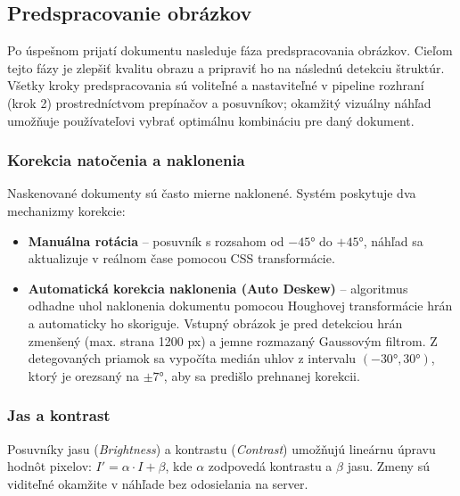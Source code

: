 

\subsection{Predspracovanie obrázkov}

Po úspešnom prijatí dokumentu nasleduje fáza predspracovania obrázkov. Cieľom tejto fázy je zlepšiť kvalitu obrazu a pripraviť ho na následnú detekciu štruktúr. Všetky kroky predspracovania sú voliteľné a nastaviteľné v pipeline rozhraní (krok 2) prostredníctvom prepínačov a posuvníkov; okamžitý vizuálny náhľad umožňuje používateľovi vybrať optimálnu kombináciu pre daný dokument.

\subsubsection{Korekcia natočenia a naklonenia}

Naskenované dokumenty sú často mierne naklonené. Systém poskytuje dva mechanizmy korekcie:
\begin{itemize}
    \item \textbf{Manuálna rotácia} – posuvník s rozsahom od $-45°$ do $+45°$, náhľad sa aktualizuje v reálnom čase pomocou CSS transformácie.
    \item \textbf{Automatická korekcia naklonenia (Auto Deskew)} – algoritmus odhadne uhol naklonenia dokumentu pomocou Houghovej transformácie hrán a automaticky ho skoriguje. Vstupný obrázok je pred detekciou hrán zmenšený (max. strana 1200 px) a jemne rozmazaný Gaussovým filtrom. Z detegovaných priamok sa vypočíta medián uhlov z intervalu $(-30°, 30°)$, ktorý je orezsaný na $\pm 7°$, aby sa predišlo prehnanej korekcii.
\end{itemize}

\subsubsection{Jas a kontrast}

Posuvníky jasu (\textit{Brightness}) a kontrastu (\textit{Contrast}) umožňujú lineárnu úpravu hodnôt pixelov: $I' = \alpha \cdot I + \beta$, kde $\alpha$ zodpovedá kontrastu a $\beta$ jasu. Zmeny sú viditeľné okamžite v náhľade bez odosielania na server.


